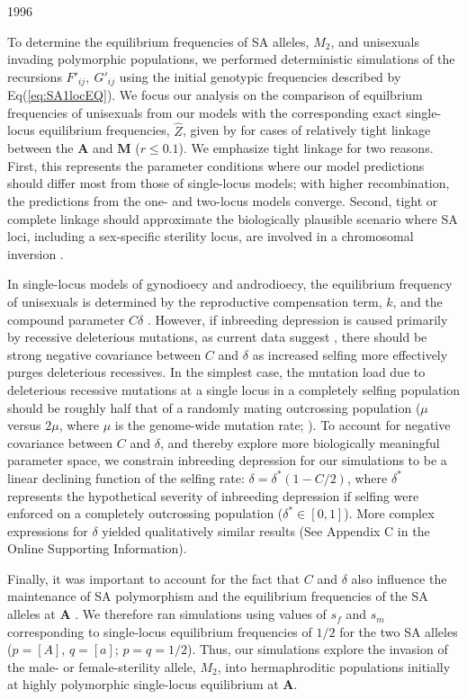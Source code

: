 1996\documentclass[9pt,twocolumn,twoside,lineno]{gsajnl}
\begin{document}
To determine the equilibrium frequencies of SA alleles, $M_2$, and unisexuals invading polymorphic populations, we performed deterministic simulations of the recursions $F'_{ij},~G'_{ij}$ using the initial genotypic frequencies described by Eq(\ref{eq:SA1locEQ}). We focus our analysis on the comparison of equilbrium frequencies of unisexuals from our models with the corresponding exact single-locus equilibrium frequencies, $\hat{Z}$, given by \citet{Charlesworth1978a} for cases of relatively tight linkage between the $\mathbf{A}$ and $\mathbf{M}$ ($r\leq 0.1$). We emphasize tight linkage for two reasons. First, this represents the parameter conditions where our model predictions should differ most from those of single-locus models; with higher recombination, the predictions from the one- and two-locus models converge. Second, tight or complete linkage should approximate the biologically plausible scenario where SA loci, including a sex-specific sterility locus, are involved in a chromosomal inversion \citep{LeeKelly2015}.

In single-locus models of gynodioecy and androdioecy, the equilibrium frequency of unisexuals is determined by the reproductive compensation term, $k$, and the compound parameter $C \delta$ \citep{Charlesworth1978a}. However, if inbreeding depression is caused primarily by recessive deleterious mutations, as current data suggest \citep{Charlesworth2009}, there should be strong negative covariance between $C$ and $\delta$ as increased selfing more effectively purges deleterious recessives. In the simplest case, the mutation load due to deleterious recessive mutations at a single locus in a completely selfing population should be roughly half that of a randomly mating outcrossing population ($\mu$ versus $2 \mu$, where $\mu$ is the genome-wide mutation rate; \citealt{OhtaCockerham1974}). To account for negative covariance between $C$ and $\delta$, and thereby explore more biologically meaningful parameter space, we constrain inbreeding depression for our simulations to be a linear declining function of the selfing rate: $\delta = \delta^\ast(1 - C/2)$, where $\delta^\ast$ represents the hypothetical severity of inbreeding depression if selfing were enforced on a completely outcrossing population ($\delta^\ast \in [0,1]$). More complex expressions for $\delta$ yielded qualitatively similar results (See Appendix C in the Online Supporting Information). 

Finally, it was important to account for the fact that $C$ and $\delta$ also influence the maintenance of SA polymorphism and the equilibrium frequencies of the SA alleles at $\mathbf{A}$ \citep{JordanConnallon2014,Olito2016}. We therefore ran simulations using values of $s_f$ and $s_m$ corresponding to single-locus equilibrium frequencies of $1/2$ for the two SA alleles ($p = [A]$, $q = [a]$; $p=q=1/2$). Thus, our simulations explore the invasion of the male- or female-sterility allele, $M_2$, into hermaphroditic populations initially at highly polymorphic single-locus equilibrium at $\mathbf{A}$.
\end{document}
